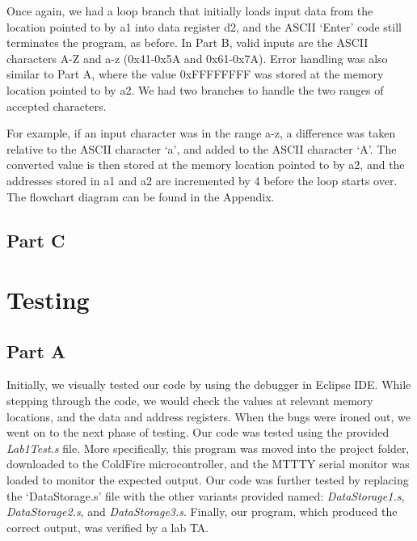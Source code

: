\documentclass[letterpaper]{article}
\begin{document}
    Once again, we had a loop branch that initially loads input data from the location
    pointed to by a1 into data register d2, and the ASCII `Enter' code still terminates
    the program, as before. In Part B, valid inputs are the ASCII characters A-Z and a-z
    (0x41-0x5A and 0x61-0x7A).
    Error handling was also similar to Part A, where the value 0xFFFFFFFF was stored at the
    memory location pointed to by a2. We had two branches to handle the two ranges of accepted
    characters.

    For example, if an input character was in the range a-z, a difference was taken
    relative to the ASCII character `a', and added to the ASCII character `A'. The
    converted value is then stored at the memory location pointed to by a2, and
    the addresses stored in a1 and a2 are incremented by 4 before the loop
    starts over. The flowchart diagram can be found in the Appendix.



    \subsection{Part C}

\section{Testing}
  \subsection{Part A}
    Initially, we visually tested our code by using the debugger in Eclipse IDE.
    While stepping through the code, we would check the values at relevant memory
    locations, and the data and address registers. When the bugs were ironed out,
    we went on to the next phase of testing.
    Our code was tested using the provided \textit{Lab1Test.s} file. More specifically,
    this program was moved into the project folder, downloaded to the ColdFire microcontroller,
    and the MTTTY serial monitor was loaded to monitor the expected output. Our code was
    further tested by replacing the `DataStorage.s' file with the other variants provided
    named: \textit{DataStorage1.s}, \textit{DataStorage2.s}, and \textit{DataStorage3.s}.
    Finally, our program, which produced the correct output, was verified by a lab TA.
\end{document}
